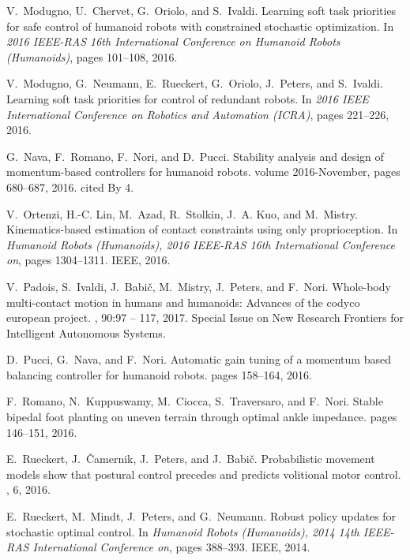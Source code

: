 \documentclass[12pt,a4paper,twoside]{article}
\begin{document}
\begin{thebibliography}{}
V.~Modugno, U.~Chervet, G.~Oriolo, and S.~Ivaldi.
\newblock Learning soft task priorities for safe control of humanoid robots
  with constrained stochastic optimization.
\newblock In {\em 2016 IEEE-RAS 16th International Conference on Humanoid
  Robots (Humanoids)}, pages 101--108, 2016.

V.~Modugno, G.~Neumann, E.~Rueckert, G.~Oriolo, J.~Peters, and S.~Ivaldi.
\newblock Learning soft task priorities for control of redundant robots.
\newblock In {\em 2016 IEEE International Conference on Robotics and Automation
  (ICRA)}, pages 221--226, 2016.

G.~Nava, F.~Romano, F.~Nori, and D.~Pucci.
\newblock Stability analysis and design of momentum-based controllers for
  humanoid robots.
\newblock volume 2016-November, pages 680--687, 2016.
\newblock cited By 4.

V.~Ortenzi, H.-C. Lin, M.~Azad, R.~Stolkin, J.~A. Kuo, and M.~Mistry.
\newblock Kinematics-based estimation of contact constraints using only
  proprioception.
\newblock In {\em Humanoid Robots (Humanoids), 2016 IEEE-RAS 16th International
  Conference on}, pages 1304--1311. IEEE, 2016.

V.~Padois, S.~Ivaldi, J.~Babi{\v c}, M.~Mistry, J.~Peters, and F.~Nori.
\newblock Whole-body multi-contact motion in humans and humanoids: Advances of
  the codyco european project.
, 90:97 -- 117, 2017.
\newblock Special Issue on New Research Frontiers for Intelligent Autonomous
  Systems.

D.~Pucci, G.~Nava, and F.~Nori.
\newblock Automatic gain tuning of a momentum based balancing controller for
  humanoid robots.
\newblock pages 158--164, 2016.
 

F.~Romano, N.~Kuppuswamy, M.~Ciocca, S.~Traversaro, and F.~Nori.
\newblock Stable bipedal foot planting on uneven terrain through optimal ankle
  impedance.
\newblock pages 146--151, 2016.

E.~Rueckert, J.~{\v{C}}amernik, J.~Peters, and J.~Babi{\v{c}}.
\newblock Probabilistic movement models show that postural control precedes and
  predicts volitional motor control.
, 6, 2016.

E.~Rueckert, M.~Mindt, J.~Peters, and G.~Neumann.
\newblock Robust policy updates for stochastic optimal control.
\newblock In {\em Humanoid Robots (Humanoids), 2014 14th IEEE-RAS International
  Conference on}, pages 388--393. IEEE, 2014.


\end{thebibliography}
\end{document}
